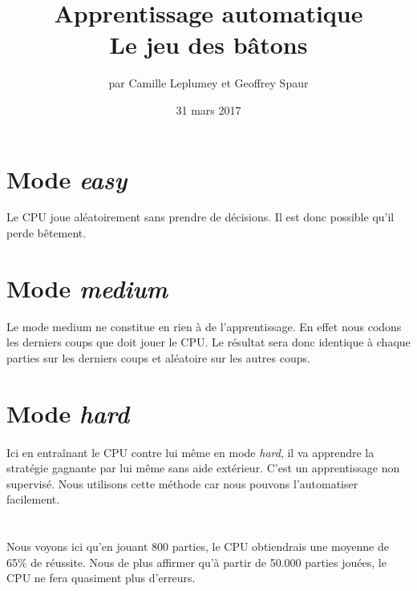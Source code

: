 \documentclass{article}
\title{Apprentissage automatique \\ Le jeu des bâtons}
\author{par Camille Leplumey et Geoffrey Spaur}
\date{31 mars 2017}
\begin{document}
\maketitle
\newpage
\tableofcontents{}
\newpage
\section{Mode \emph{easy}}
  Le CPU joue aléatoirement sans prendre de décisions. Il est donc possible qu'il perde bêtement.
\section{Mode \emph{medium}}
  Le mode medium ne constitue en rien à de l'apprentissage. En effet nous codons les derniers coups que doit
  jouer le CPU. Le résultat sera donc identique à chaque parties sur les derniers coups et aléatoire sur les autres coups.
\section{Mode \emph{hard}}
  \paragraph{}
    Ici en entraînant le CPU contre lui même en mode \emph{hard}, il va apprendre la stratégie gagnante par lui même sans aide extérieur. 
    C'est un apprentissage non supervisé. Nous utilisons cette méthode car nous pouvons l'automatiser facilement.
  \paragraph{}
    \\
    Nous voyons ici qu'en jouant 800 parties, le CPU obtiendrais une moyenne de 65\% de réussite. Nous de
    plus affirmer qu'à partir de 50.000 parties jouées, le CPU ne fera quasiment plus d'erreurs.
\end{document}

